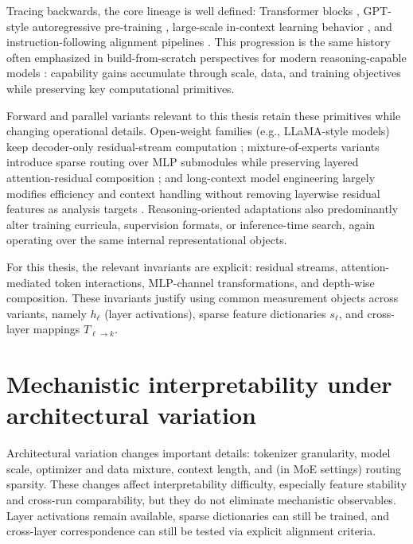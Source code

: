 \documentclass[../ppgc-tese.tex]{subfiles}
\begin{document}
Tracing backwards, the core lineage is well defined: Transformer blocks \cite{vaswani2017attention}, GPT-style autoregressive pre-training \cite{radford2018improving,radford2019language}, large-scale in-context learning behavior \cite{brown2020gpt3}, and instruction-following alignment pipelines \cite{ouyang2022instructgpt}. This progression is the same history often emphasized in build-from-scratch perspectives for modern reasoning-capable models \cite{raschka2024buildllm}: capability gains accumulate through scale, data, and training objectives while preserving key computational primitives.

Forward and parallel variants relevant to this thesis retain these primitives while changing operational details. Open-weight families (e.g., LLaMA-style models) keep decoder-only residual-stream computation \cite{touvron2023llama}; mixture-of-experts variants introduce sparse routing over MLP submodules while preserving layered attention-residual composition \cite{fedus2022switch,jiang2024mixtral}; and long-context model engineering largely modifies efficiency and context handling without removing layerwise residual features as analysis targets \cite{rae2022scaling}. Reasoning-oriented adaptations also predominantly alter training curricula, supervision formats, or inference-time search, again operating over the same internal representational objects.

For this thesis, the relevant invariants are explicit: residual streams, attention-mediated token interactions, MLP-channel transformations, and depth-wise composition. These invariants justify using common measurement objects across variants, namely $h_\ell$ (layer activations), sparse feature dictionaries $s_\ell$, and cross-layer mappings $T_{\ell\to k}$.

\section{Mechanistic interpretability under architectural variation}
\label{sec:mechinterp-variation}
Architectural variation changes important details: tokenizer granularity, model scale, optimizer and data mixture, context length, and (in MoE settings) routing sparsity. These changes affect interpretability difficulty, especially feature stability and cross-run comparability, but they do not eliminate mechanistic observables. Layer activations remain available, sparse dictionaries can still be trained, and cross-layer correspondence can still be tested via explicit alignment criteria.
\end{document}
